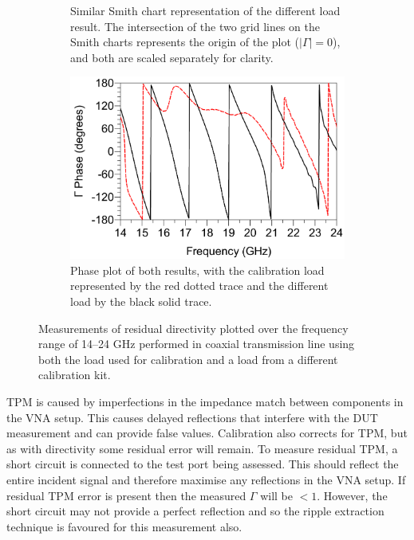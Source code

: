\documentclass[../thesis/thesis.tex]{subfiles}
\begin{document}
\begin{figure}
\begin{subfigure}{0.45\textwidth}
	    \caption{Similar Smith chart representation of the different load result. The intersection of the two grid lines on the Smith charts represents the origin of the plot ($|\Gamma|=0$), and both are scaled separately for clarity.}
    \end{subfigure}
	\par\bigskip
	\begin{subfigure}{0.6\textwidth}
	    \centering
		\includegraphics[width=\linewidth]{dir-c.png}
		\caption{Phase plot of both results, with the calibration load represented by the red dotted trace and the different load by the black solid trace.}
	\end{subfigure}
	\caption[Measurements of residual directivity performed in coaxial transmission line.]{Measurements of residual directivity plotted over the frequency range of 14--24 GHz performed in coaxial transmission line using both the load used for calibration and a load from a different calibration kit.}
	\label{ch4_fig_dir}
\end{figure}

TPM is caused by imperfections in the impedance match between components in the VNA setup. This causes delayed reflections that interfere with the DUT measurement and can provide false values. Calibration also corrects for TPM, but as with directivity some residual error will remain. To measure residual TPM, a short circuit is connected to the test port being assessed. This should reflect the entire incident signal and therefore maximise any reflections in the VNA setup. If residual TPM error is present then the measured $\Gamma$ will be $<1$. However, the short circuit may not provide a perfect reflection and so the ripple extraction technique is favoured for this measurement also.
\end{document}
